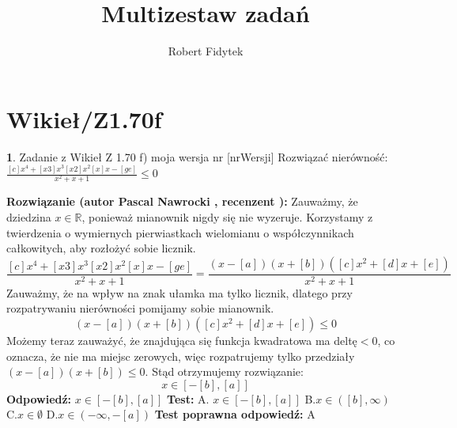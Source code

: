 \documentclass[12pt, a4paper]{article}
\title{Multizestaw zadań}
\author{Robert Fidytek}
\date{}
\theoremstyle{definition} %
\newtheorem{zad}{}
\newcommand{\kategoria}[1]{\section{#1}} %
\newcommand{\zadStart}[1]{\begin{zad}#1\newline} %
\newcommand{\zadStop}{\end{zad}}   %
\newcommand{\rozwStart}[2]{\noindent \textbf{Rozwiązanie (autor #1 , recenzent #2): }\newline} %
\newcommand{\rozwStop}{\newline}                                            %
\newcommand{\odpStart}{\noindent \textbf{Odpowiedź:}\newline}    %
\newcommand{\odpStop}{\newline}                                             %
\newcommand{\testStart}{\noindent \textbf{Test:}\newline} %
\newcommand{\testStop}{\newline} %
\newcommand{\kluczStart}{\noindent \textbf{Test poprawna odpowiedź:}\newline} %
\newcommand{\kluczStop}{\newline} %
\begin{document}
\maketitle


\kategoria{Wikieł/Z1.70f}
\zadStart{Zadanie z Wikieł Z 1.70 f) moja wersja nr [nrWersji]}
Rozwiązać nierówność: $\frac{[c]x^4+[x3]x^3[x2]x^2[x]x-[ge]}{x^2+x+1}\leq0$
\zadStop
\rozwStart{Pascal Nawrocki}{}
Zauważmy, że dziedzina $x\in\mathbb R$, ponieważ mianownik nigdy się nie wyzeruje. Korzystamy z twierdzenia o wymiernych pierwiastkach wielomianu o współczynnikach całkowitych, aby rozłożyć sobie licznik.
$$\frac{[c]x^4+[x3]x^3[x2]x^2[x]x-[ge]}{x^2+x+1}=\frac{(x-[a])(x+[b])([c]x^2+[d]x+[e])}{x^2+x+1}$$
Zauważmy, że na wpływ na znak ułamka ma tylko licznik, dlatego przy rozpatrywaniu nierówności pomijamy sobie mianownik.
$$(x-[a])(x+[b])([c]x^2+[d]x+[e])\leq0$$
Możemy teraz zauważyć, że znajdująca się funkcja kwadratowa ma deltę$<0$, co oznacza, że nie ma miejsc zerowych, więc rozpatrujemy tylko przedziały $(x-[a])(x+[b])\leq0$.
Stąd otrzymujemy rozwiązanie:
$$x\in[-[b],[a]]$$
\rozwStop
\odpStart
$x\in[-[b],[a]]$
\odpStop
\testStart
A. $x\in[-[b],[a]]$
B.$x\in([b],\infty)$
C.$x\in\emptyset$
D.$x\in(-\infty,-[a])$
\testStop
\kluczStart
A
\kluczStop
\end{document}
